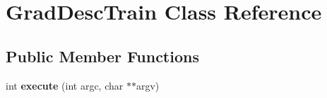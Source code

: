 \hypertarget{classGradDescTrain}{
\section{GradDescTrain Class Reference}
\label{classGradDescTrain}
}
\subsection*{Public Member Functions}
\begin{DoxyCompactItemize}
\item 
\hypertarget{classGradDescTrain_ad3c24cf0f7dc765ac3df0655170b3b63}{
int {\bfseries execute} (int argc, char $\ast$$\ast$argv)}
\label{classGradDescTrain_ad3c24cf0f7dc765ac3df0655170b3b63}

\end{DoxyCompactItemize}
